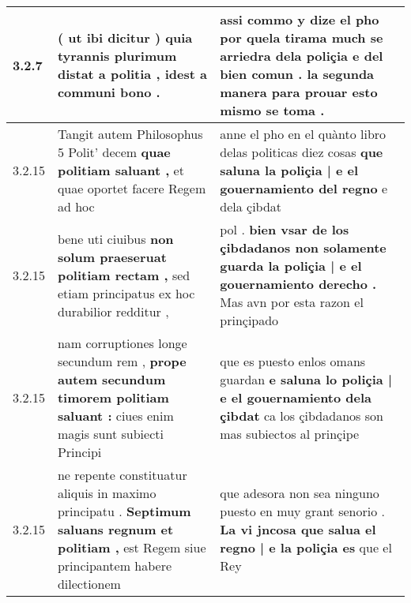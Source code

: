 \begin{tabular}{|p{1cm}|p{6.5cm}|p{6.5cm}|}
3.2.7 & ( ut ibi dicitur ) \textbf{ quia tyrannis plurimum distat a politia , } idest a communi bono . & assi commo y dize el pho \textbf{ por quela tirama much se arriedra dela poliçia e del bien comun . } la segunda manera para prouar esto mismo se toma . \\\hline
3.2.15 & Tangit autem Philosophus 5 Polit’ decem \textbf{ quae politiam saluant , } et quae oportet facere Regem ad hoc & anne el pho en el quànto libro delas politicas diez cosas \textbf{ que saluna la poliçia | e el gouernamiento del regno } e dela çibdat \\\hline
3.2.15 & bene uti ciuibus \textbf{ non solum praeseruat politiam rectam , } sed etiam principatus ex hoc durabilior redditur , & pol . \textbf{ bien vsar de los çibdadanos non solamente guarda la poliçia | e el gouernamiento derecho . } Mas avn por esta razon el prinçipado \\\hline
3.2.15 & nam corruptiones longe secundum rem , \textbf{ prope autem secundum timorem politiam saluant : } ciues enim magis sunt subiecti Principi & que es puesto enlos omans guardan \textbf{ e saluna lo poliçia | e el gouernamiento dela çibdat } ca los çibdadanos son mas subiectos al prinçipe \\\hline
3.2.15 & ne repente constituatur aliquis in maximo principatu . \textbf{ Septimum saluans regnum et politiam , } est Regem siue principantem habere dilectionem & que adesora non sea ninguno puesto en muy grant senorio . \textbf{ La vi jncosa que salua el regno | e la poliçia es } que el Rey \\\hline

\end{tabular}
